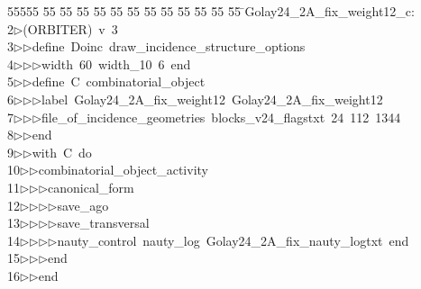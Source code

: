 %
%
\begin{tabbing}
55555 \= 55 \= 55 \= 55 \= 55 \= 55 \= 55 \= 55 \= 55 \= 55 \= 55 \= 55 \= 55 \= \>Golay24\_2A\_fix\_weight12\_c:\\[0pt]
2\>$\triangleright$\>(ORBITER)\ v\ 3\ \\[0pt]
3\>$\triangleright$\>$\triangleright$\>define\ Doinc\ draw\_incidence\_structure\_options\ \\[0pt]
4\>$\triangleright$\>$\triangleright$\>$\triangleright$\>width\ 60\ width\_10\ 6\ end\ \\[0pt]
5\>$\triangleright$\>$\triangleright$\>define\ C\ combinatorial\_object\ \\[0pt]
6\>$\triangleright$\>$\triangleright$\>$\triangleright$\>label\ Golay24\_2A\_fix\_weight12\ Golay24\_2A\_fix\_weight12\ \\[0pt]
7\>$\triangleright$\>$\triangleright$\>$\triangleright$\>file\_of\_incidence\_geometries\ blocks\_v24\_flagstxt\ 24\ 112\ 1344\ \\[0pt]
8\>$\triangleright$\>$\triangleright$\>end\ \\[0pt]
9\>$\triangleright$\>$\triangleright$\>with\ C\ do\ \\[0pt]
10\>$\triangleright$\>$\triangleright$\>combinatorial\_object\_activity\ \\[0pt]
11\>$\triangleright$\>$\triangleright$\>$\triangleright$\>canonical\_form\ \\[0pt]
12\>$\triangleright$\>$\triangleright$\>$\triangleright$\>$\triangleright$\>save\_ago\ \\[0pt]
13\>$\triangleright$\>$\triangleright$\>$\triangleright$\>$\triangleright$\>save\_transversal\ \\[0pt]
14\>$\triangleright$\>$\triangleright$\>$\triangleright$\>$\triangleright$\>nauty\_control\ nauty\_log\ Golay24\_2A\_fix\_nauty\_logtxt\ end\ \\[0pt]
15\>$\triangleright$\>$\triangleright$\>$\triangleright$\>end\ \\[0pt]
16\>$\triangleright$\>$\triangleright$\>end\ \\[0pt]

\end{tabbing}
